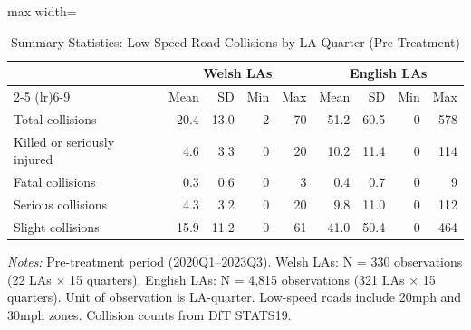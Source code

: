 \begin{table}[H]
\centering
\caption{Summary Statistics: Low-Speed Road Collisions by LA-Quarter (Pre-Treatment)}
\label{tab:summary}
\begin{threeparttable}
\begin{adjustbox}{max width=\textwidth}
\begin{tabular}{l rrrr rrrr}
\toprule
& \multicolumn{4}{c}{Welsh LAs} & \multicolumn{4}{c}{English LAs} \\
\cmidrule(lr){2-5} \cmidrule(lr){6-9}
& Mean & SD & Min & Max & Mean & SD & Min & Max \\
\midrule
Total collisions & 20.4 & 13.0 & 2 & 70 & 51.2 & 60.5 & 0 & 578 \\
Killed or seriously injured & 4.6 & 3.3 & 0 & 20 & 10.2 & 11.4 & 0 & 114 \\
Fatal collisions & 0.3 & 0.6 & 0 & 3 & 0.4 & 0.7 & 0 & 9 \\
Serious collisions & 4.3 & 3.2 & 0 & 20 & 9.8 & 11.0 & 0 & 112 \\
Slight collisions & 15.9 & 11.2 & 0 & 61 & 41.0 & 50.4 & 0 & 464 \\
\bottomrule
\end{tabular}
\end{adjustbox}
\begin{tablenotes}[flushleft]
\small
\item \textit{Notes:} Pre-treatment period (2020Q1--2023Q3). Welsh LAs: N = 330 observations (22 LAs $\times$ 15 quarters). English LAs: N = 4,815 observations (321 LAs $\times$ 15 quarters). Unit of observation is LA-quarter. Low-speed roads include 20mph and 30mph zones. Collision counts from DfT STATS19.
\end{tablenotes}
\end{threeparttable}
\end{table}
